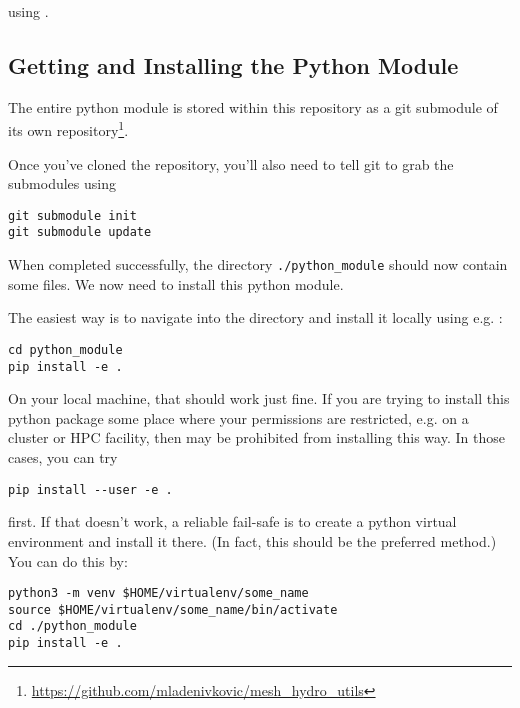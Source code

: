 using .








\subsection{Getting and Installing the Python Module}\label{chap:py}


The entire \mhutils python module is stored within this repository as a git
submodule of its own
repository\footnote{\url{https://github.com/mladenivkovic/mesh_hydro_utils}}.

Once you've cloned the \hydro repository, you'll also need to tell git to grab
the submodules using

\begin{lstlisting}
git submodule init
git submodule update
\end{lstlisting}

When completed successfully, the directory \verb|./python_module| should now
contain some files. We now need to install this python module.

The easiest way is to navigate into the directory and install it locally using
e.g. :

\begin{lstlisting}
cd python_module
pip install -e .
\end{lstlisting}

On your local machine, that should work just fine. If you are trying to install
this python package some place where your permissions are restricted, e.g. on a
cluster or HPC facility, then  may be prohibited from installing this
way. In those cases, you can try

\begin{lstlisting}
pip install --user -e .
\end{lstlisting}

first. If that doesn't work, a reliable fail-safe is to create a python virtual
environment and install it there. (In fact, this should be the preferred
method.) You can do this by:

\begin{lstlisting}
python3 -m venv $HOME/virtualenv/some_name
source $HOME/virtualenv/some_name/bin/activate
cd ./python_module
pip install -e .
\end{lstlisting}

